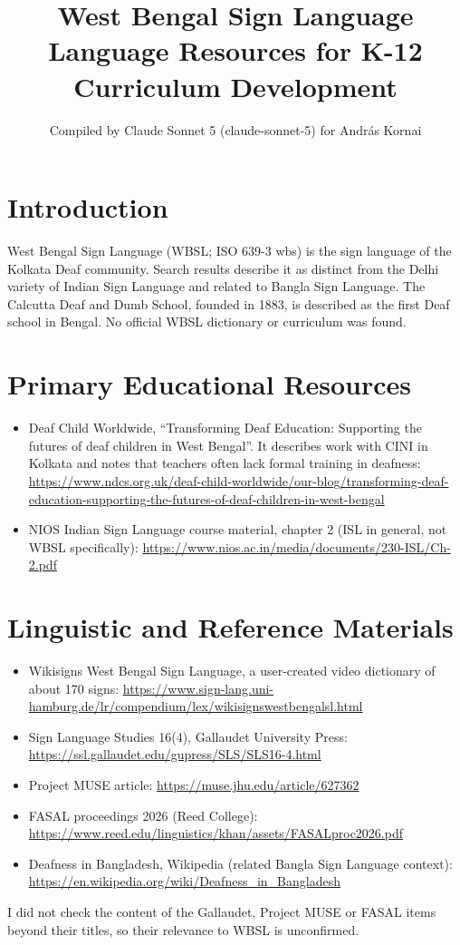 \documentclass[12pt]{article}
\title{West Bengal Sign Language Language Resources for K-12 Curriculum Development}
\author{Compiled by Claude Sonnet 5 (claude-sonnet-5) for Andr\'as Kornai}
\date{}
\begin{document}
\maketitle

\section{Introduction}
West Bengal Sign Language (WBSL; ISO 639-3 wbs) is the sign language of the Kolkata Deaf community. Search results describe it as distinct from the Delhi variety of Indian Sign Language and related to Bangla Sign Language. The Calcutta Deaf and Dumb School, founded in 1883, is described as the first Deaf school in Bengal. No official WBSL dictionary or curriculum was found.

\section{Primary Educational Resources}
\begin{itemize}
\item Deaf Child Worldwide, ``Transforming Deaf Education: Supporting the futures of deaf children in West Bengal''. It describes work with CINI in Kolkata and notes that teachers often lack formal training in deafness: \url{https://www.ndcs.org.uk/deaf-child-worldwide/our-blog/transforming-deaf-education-supporting-the-futures-of-deaf-children-in-west-bengal}
\item NIOS Indian Sign Language course material, chapter 2 (ISL in general, not WBSL specifically): \url{https://www.nios.ac.in/media/documents/230-ISL/Ch-2.pdf}
\end{itemize}

\section{Linguistic and Reference Materials}
\begin{itemize}
\item Wikisigns West Bengal Sign Language, a user-created video dictionary of about 170 signs: \url{https://www.sign-lang.uni-hamburg.de/lr/compendium/lex/wikisignswestbengalsl.html}
\item Sign Language Studies 16(4), Gallaudet University Press: \url{https://ssl.gallaudet.edu/gupress/SLS/SLS16-4.html}
\item Project MUSE article: \url{https://muse.jhu.edu/article/627362}
\item FASAL proceedings 2026 (Reed College): \url{https://www.reed.edu/linguistics/khan/assets/FASALproc2026.pdf}
\item Deafness in Bangladesh, Wikipedia (related Bangla Sign Language context): \url{https://en.wikipedia.org/wiki/Deafness_in_Bangladesh}
\end{itemize}
I did not check the content of the Gallaudet, Project MUSE or FASAL items beyond their titles, so their relevance to WBSL is unconfirmed.
\end{document}
